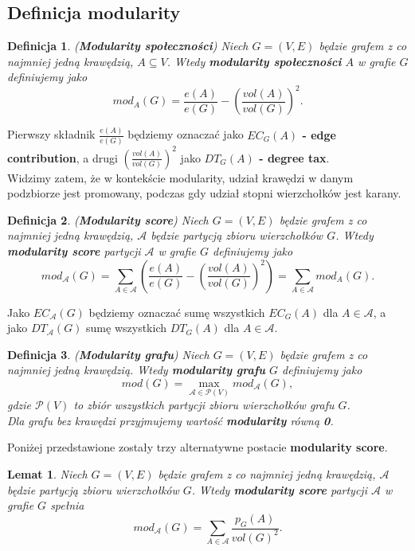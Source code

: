 \documentclass[letterpaper,12pt]{article}
\newtheorem{definition}{Definicja}
\newtheorem{lemma}{Lemat}
\begin{document}
\subsection{Definicja modularity} \label{def_mod}
\begin{definition}
  (\textbf{Modularity społeczności}) Niech \(G = (V, E)\) będzie grafem z co najmniej jedną krawędzią, \(A \subseteq V\). Wtedy \textbf{modularity społeczności} \(A\) w grafie \(G\) definiujemy jako
  \[
    mod_A(G) = \frac{e(A)}{e(G)} - {\left(\frac{vol(A)}{vol(G)}\right)}^2.
  \]
\end{definition}
Pierwszy składnik \(\frac{e(A)}{e(G)}\) będziemy oznaczać jako \textbf{\(EC_G(A)\) - edge contribution}, a drugi \({\left(\frac{vol(A)}{vol(G)}\right)}^2\) jako \textbf{\(DT_G(A)\) -  degree tax}.\\

Widzimy zatem, że w kontekście modularity, udział krawędzi w danym podzbiorze jest promowany, podczas gdy udział stopni wierzchołków jest karany.\\

\begin{definition}
  (\textbf{Modularity score}) Niech \(G = (V, E)\) będzie grafem z co najmniej jedną krawędzią, \(\mathcal{A}\) będzie partycją zbioru wierzchołków \(G\). Wtedy \textbf{modularity score} partycji \(\mathcal{A}\) w grafie \(G\) definiujemy jako
  \[
    mod_{\mathcal{A}}(G) = \sum_{A \in \mathcal{A}} \left(\frac{e(A)}{e(G)} - {\left(\frac{vol(A)}{vol(G)}\right)}^2\right) = \sum_{A \in \mathcal{A}} mod_A(G).
  \]
\end{definition}
Jako \textbf{\(EC_{\mathcal{A}}(G)\)} będziemy oznaczać sumę wszystkich \(EC_G(A)\) dla \(A \in \mathcal{A}\), a jako \textbf{\(DT_{\mathcal{A}}(G)\)} sumę wszystkich \(DT_G(A)\) dla \(A \in \mathcal{A}\).\\

\begin{definition}
  (\textbf{Modularity grafu}) Niech \(G = (V, E)\) będzie grafem z co najmniej jedną krawędzią. Wtedy \textbf{modularity grafu} \(G\) definiujemy jako
  \[
    mod(G) = \max_{\mathcal{A} \in \mathcal{P}(V)} mod_{\mathcal{A}}(G),
  \]
  gdzie \(\mathcal{P}(V)\) to zbiór wszystkich partycji zbioru wierzchołków grafu \(G\).\\

  Dla grafu bez krawędzi przyjmujemy wartość \textbf{modularity} równą \textbf{0}.
\end{definition}

Poniżej przedstawione zostały trzy alternatywne postacie \textbf{modularity score}.
\begin{lemma}
  Niech \(G = (V, E)\) będzie grafem z co najmniej jedną krawędzią, \(\mathcal{A}\) będzie partycją zbioru wierzchołków \(G\). Wtedy \textbf{modularity score} partycji \(\mathcal{A}\) w grafie \(G\) spełnia
  \[mod_{\mathcal{A}}(G) = \sum_{A \in \mathcal{A}} \frac{p_G(A)}{vol(G)^2}.\]
\end{lemma}
\end{document}
